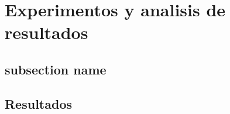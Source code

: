 \section{Experimentos y analisis de resultados}
\subsection{subsection name}

\subsection{Resultados}
